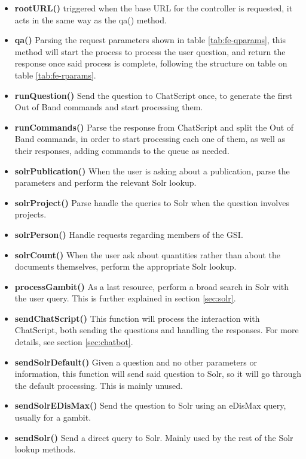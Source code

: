 \begin{itemize}
  \item \textbf{rootURL()} triggered when the base URL for the controller is requested, it acts in the same way as the qa() method.
  \item \textbf{qa()} Parsing the request parameters shown in table \ref{tab:fe-qparams}, this method will start the process to process the user question, and return the response once said process is complete, following the structure on table on table \ref{tab:fe-rparams}. 
  \item \textbf{runQuestion()} Send the question to ChatScript once, to generate the first Out of Band commands and start processing them.
  \item \textbf{runCommands()} Parse the response from ChatScript and split the Out of Band commands, in order to start processing each one of them, as well as their responses, adding commands to the queue as needed.
  \item \textbf{solrPublication()} When the user is asking about a publication, parse the parameters and perform the relevant Solr lookup.
  \item \textbf{solrProject()} Parse handle the queries to Solr when the question involves projects.
  \item \textbf{solrPerson()} Handle requests regarding members of the GSI.
  \item \textbf{solrCount()} When the user ask about quantities rather than about the documents themselves, perform the appropriate Solr lookup.
  \item \textbf{processGambit()} As a last resource, perform a broad search in Solr with the user query. This is further explained in section \ref{sec:solr}.
  \item \textbf{sendChatScript()} This function will process the interaction with ChatScript, both sending the questions and handling the responses. For more details, see section \ref{sec:chatbot}.
  \item \textbf{sendSolrDefault()} Given a question and no other parameters or information, this function will send said question to Solr, so it will go through the default processing. This is mainly unused.
  \item \textbf{sendSolrEDisMax()} Send the question to Solr using an \ac{eDisMax} query, usually for a gambit. 
  \item \textbf{sendSolr()} Send a direct query to Solr. Mainly used by the rest of the Solr lookup methods.
\end{itemize}

